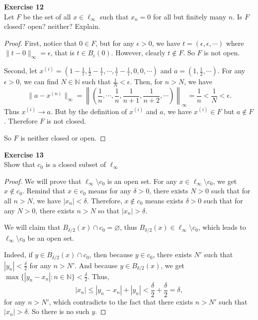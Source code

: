 \documentclass[12pt, a4paper]{article}
\theoremstyle{plain}
\newcommand{\N}{\mathbb{N}}
\newenvironment{exercise}[2][Exercise]
    { \begin{mdframed}[backgroundcolor=gray!20] \textbf{#1 #2} \\}
    {  \end{mdframed}}
\begin{document}
\begin{exercise}{12}
Let $F$ be the set of all $x\in \ell_\infty$ such that $x_n=0$ for all but finitely many $n$. Is $F$ closed? open? neither? Explain.
\end{exercise}
	\begin{proof}
	First, notice that $0\in F$, but for any $\epsilon >0$, we have $t=(\epsilon,\epsilon,\cdots)$ where $\|t-0\|_\infty=\epsilon$, that is $t\in B_\epsilon(0)$. However, clearly $t\notin F$. So $F$ is not open.
	
	Second, let $x^{(i)}=(1-\frac{1}{i},\frac{1}{2}-\frac{1}{i},\cdots,\frac{1}{i}-\frac{1}{i},0,0,\cdots)$ and $a=(1,\frac{1}{2},\cdots)$. For any $\epsilon>0$, we can find $N\in\N$ such that $\frac{1}{N}<\epsilon$. Then, for $n>N$, we have
	\[
	\|a-x^{(n)}\|_\infty=\left\|\left(\frac{1}{n},\cdots,\frac{1}{n},\frac{1}{n+1},\frac{1}{n+2},\cdots\right)\right\|_\infty=\frac{1}{n}<\frac{1}{N}<\epsilon.
	\]
	Thus $x^{(i)}\rightarrow a$. But by the definition of $x^{(i)}$ and $a$, we have $x^{(i)}\in F$ but $a\notin F$. Therefore $F$ is not closed.
	
	So $F$ is neither closed or open. 
	\end{proof}

\begin{exercise}{13}
Show that $c_0$ is a closed subset of $\ell_\infty$
\end{exercise}
	\begin{proof}
	We will prove that $\ell_\infty\setminus c_0$ is an open set. For any $x\in \ell_\infty\setminus c_0$, we get $x\notin c_0$. Remind that $x\in c_0$ means for any $\delta >0$, there exists $N>0$ such that for all $n>N$, we have $|x_n|<\delta$. Therefore, $x\notin c_0$ means exists $\delta>0$ such that for any $N>0$, there exists $n>N$ so that $|x_n|>\delta$.
	
	 We will claim that $B_{\delta/2}(x)\cap c_0=\varnothing$, thus $B_{\delta/2}(x)\in \ell_\infty\setminus c_0$, which leads to $\ell_\infty\setminus c_0$ be an open set.
	
	 Indeed, if $y\in B_{\delta/2}(x)\cap c_0$, then because $y\in c_0$, there exists $N'$ such that $|y_n|<\frac{\delta}{2}$ for any $n>N'$. And because $y\in B_{\delta/2}(x)$, we get $\max\{|y_n-x_n|:n\in \N\}<\frac{\delta}{2}$. Thus,
	 \[
	 |x_n|\leq |y_n-x_n|+|y_n|<\frac{\delta}{2}+\frac{\delta}{2}=\delta,
	 \]
	 for any $n>N'$, which contradicts to the fact that there exists $n>N'$ such that $|x_n|>\delta$. So there is no such $y$.
	\end{proof}
\end{document}
